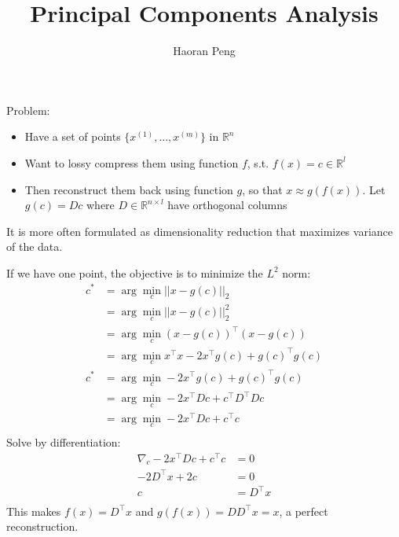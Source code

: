 \documentclass{article}
\begin{document}
\title{Principal Components Analysis}
\author{Haoran Peng}
\maketitle

Problem:
\begin{itemize}
\item Have a set of points $\{x^{(1)},\ldots, x^{(m)}\}$ in $\mathbb{R}^n$ 
\item Want to lossy compress them using function $f$, s.t. $f(x) = c \in \mathbb{R}^l$
\item Then reconstruct them back using function $g$, so that $x \approx g(f(x))$. Let $g(c) = Dc$ where $D\in \mathbb{R}^{n\times l}$ have orthogonal columns
\end{itemize}
It is more often formulated as dimensionality reduction that maximizes variance of the data.

If we have one point, the objective is to minimize the $L^2$ norm:
\begin{align*}
c^* &= \arg \min_c || x - g(c)||_2\\
&= \arg \min_c || x - g(c)||_2^2\\
&= \arg \min_c (x - g(c))^\top(x - g(c))\\
&=\arg\min_c x^\top x - 2x^\top g(c)  + g(c)^\top g(c)\\
c^* &=\arg\min_c  - 2x^\top g(c)  + g(c)^\top g(c)\\
&=\arg\min_c  - 2x^\top Dc  + c^\top D^\top Dc\\
&=\arg\min_c  - 2x^\top Dc  + c^\top c\\
\end{align*}
Solve by differentiation:
\begin{align*}
\nabla_c - 2x^\top Dc  + c^\top c &= 0\\
- 2D^\top x  + 2 c &= 0\\
c &= D^\top x\\
\end{align*}
This makes $f(x) = D^\top x$ and $g(f(x)) = DD^\top x = x$, a perfect reconstruction.
\end{document}
